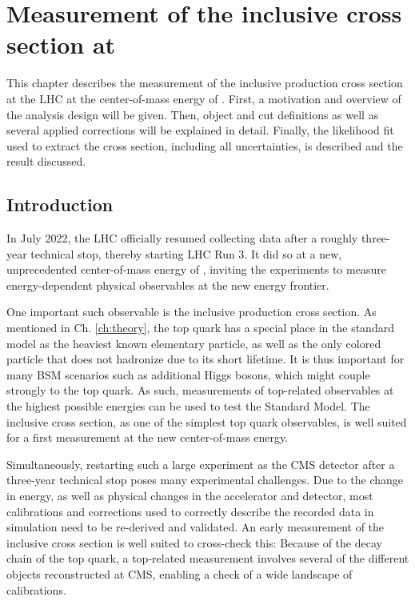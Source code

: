 \chapter{Measurement of the inclusive \ttbartitle cross section at \texorpdfstring{\sqrtsRIII}{sqrt(s) = 13 TeV}}
\label{ch:ttxs}

This chapter describes the measurement of the inclusive \ttbar production cross section at the LHC at the center-of-mass energy of \sqrtsRIII. First, a motivation and overview of the analysis design will be given. Then, object and cut definitions as well as several applied corrections will be explained in detail. Finally, the likelihood fit used to extract the cross section, including all uncertainties, is described and the result discussed.

\section{Introduction}



In July 2022, the LHC officially resumed collecting data after a roughly three-year technical stop, thereby starting LHC Run 3. It did so at a new, unprecedented center-of-mass energy of \sqrtsRIII, inviting the experiments to measure energy-dependent physical observables at the new energy frontier.

One important such observable is the inclusive \ttbar production cross section. As mentioned in Ch. \ref{ch:theory}, the top quark has a special place in the standard model as the heaviest known elementary particle, as well as the only colored particle that does not hadronize due to its short lifetime. It is thus important for many BSM scenarios such as additional Higgs bosons, which might couple strongly to the top quark. As such, measurements of top-related observables at the highest possible energies can be used to test the Standard Model. The inclusive \ttbar cross section, as one of the simplest top quark observables, is well suited for a first measurement at the new center-of-mass energy.

Simultaneously, restarting such a large experiment as the CMS detector after a three-year technical stop poses many experimental challenges. Due to the change in energy, as well as physical changes in the accelerator and detector, most calibrations and corrections used to correctly describe the recorded data in simulation need to be re-derived and validated. An early measurement of the inclusive \ttbar cross section is well suited to cross-check this: Because of the decay chain of the top quark, a top-related measurement involves several of the different objects reconstructed at CMS, 
enabling a check of a wide landscape of calibrations.

